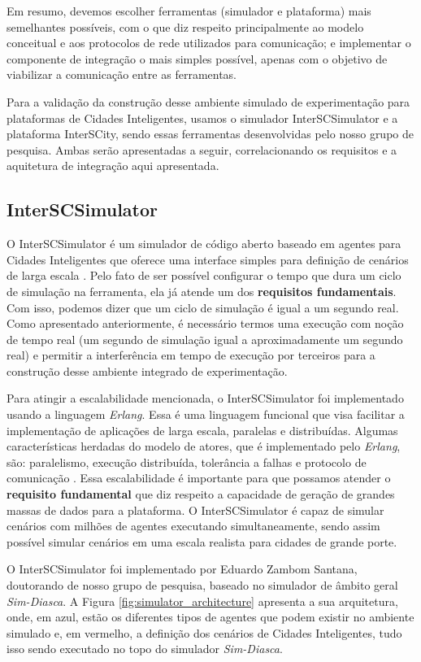 Em resumo, devemos escolher ferramentas (simulador e plataforma) mais semelhantes possíveis, com o que diz respeito principalmente ao modelo conceitual e aos protocolos de
rede utilizados para comunicação; e implementar o componente de integração o mais simples possível, apenas com o objetivo de viabilizar a comunicação entre as ferramentas.

Para a validação da construção desse ambiente simulado de experimentação para plataformas de Cidades Inteligentes, usamos o simulador InterSCSimulator e a plataforma InterSCity,
sendo essas ferramentas desenvolvidas pelo nosso grupo de pesquisa. Ambas serão apresentadas a seguir, correlacionando os requisitos e a aquitetura de integração aqui
apresentada.

\subsection{InterSCSimulator}

O InterSCSimulator é um simulador de código aberto baseado em agentes para Cidades Inteligentes que oferece uma interface simples para definição de
cenários de larga escala \cite{santana_17}.
Pelo fato de ser possível configurar o tempo que dura um ciclo de simulação na ferramenta, ela já atende um dos \textbf{requisitos fundamentais}.
Com isso, podemos dizer que um ciclo de simulação é igual a um segundo real.
Como apresentado anteriormente, é necessário termos uma execução com noção de tempo real (um segundo de simulação igual a aproximadamente um segundo real) e permitir a
interferência em tempo de execução por terceiros para a construção desse ambiente integrado de experimentação.

Para atingir a escalabilidade mencionada, o InterSCSimulator foi implementado usando a linguagem \textit{Erlang}.
Essa é uma linguagem funcional que visa facilitar a implementação de aplicações de larga escala, paralelas e distribuídas.
Algumas características herdadas do modelo de atores, que é implementado pelo \textit{Erlang}, são: paralelismo, execução distribuída, tolerância a falhas e
protocolo de comunicação \cite{santana_17}.
Essa escalabilidade é importante para que possamos atender o \textbf{requisito fundamental} que diz respeito a capacidade de geração de grandes massas de dados
para a plataforma.
O InterSCSimulator é capaz de simular cenários com milhões de agentes executando simultaneamente, sendo assim possível simular cenários em uma escala realista para cidades de grande porte.

O InterSCSimulator foi implementado por Eduardo Zambom Santana, doutorando de nosso grupo de pesquisa, baseado no simulador de âmbito geral \textit{Sim-Diasca}.
A Figura \ref{fig:simulator_architecture} apresenta a sua arquitetura, onde, em azul, estão os diferentes tipos de agentes que podem existir no ambiente
simulado e, em vermelho, a definição dos cenários de Cidades Inteligentes, tudo isso sendo executado no topo do simulador \textit{Sim-Diasca}.

